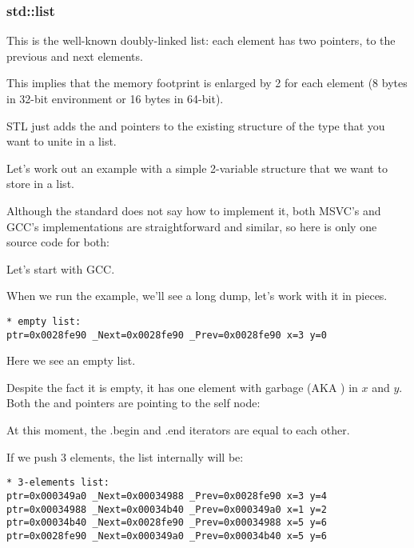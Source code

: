 \subsubsection{std::list}
\label{std_list}

This is the well-known doubly-linked list: each element has two pointers, to the previous and next
elements.

This implies that the memory footprint is enlarged by 2  for each element (8 bytes in 32-bit environment or 16 bytes in 64-bit).

\Cpp STL just adds the  and  pointers to the existing structure of the type that you want to 
unite in a list.

Let's work out an example with a simple 2-variable structure that we want to store in a list.

Although the \Cpp standard does not say how to implement it, 
both MSVC's and GCC's implementations are straightforward and similar, so here is only one
source code for both:




Let's start with GCC.

When we run the example, we'll see a long dump, let's work with it in pieces.

\begin{lstlisting}
* empty list:
ptr=0x0028fe90 _Next=0x0028fe90 _Prev=0x0028fe90 x=3 y=0
\end{lstlisting}

Here we see an empty list.

Despite the fact it is empty, it has one element with garbage (\ac{AKA} )
in $x$ and $y$.
Both the  and  pointers are pointing to the self node:



At this moment, the .begin and .end iterators are equal to each other.

If we push 3 elements, the list internally will be:

\begin{lstlisting}
* 3-elements list:
ptr=0x000349a0 _Next=0x00034988 _Prev=0x0028fe90 x=3 y=4
ptr=0x00034988 _Next=0x00034b40 _Prev=0x000349a0 x=1 y=2
ptr=0x00034b40 _Next=0x0028fe90 _Prev=0x00034988 x=5 y=6
ptr=0x0028fe90 _Next=0x000349a0 _Prev=0x00034b40 x=5 y=6
\end{lstlisting}

